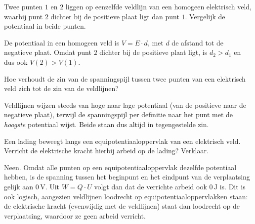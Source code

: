 \documentclass{ximera}
\begin{document}
\begin{question}
    Twee punten $1$ en $2$ liggen op eenzelfde veldlijn van een homogeen elektrisch veld, waarbij punt $2$ dichter bij de positieve plaat ligt dan punt $1$. Vergelijk de potentiaal in beide punten.

    \begin{multipleChoice}
    \end{multipleChoice}

    \begin{solution}\nl
        De potentiaal in een homogeen veld is $V = E \cdot d$, met $d$ de afstand tot de negatieve plaat. Omdat punt $2$ dichter bij de positieve plaat ligt, is $d_2 > d_1$ en dus ook $V(2) > V(1)$.
    \end{solution}
\end{question}

\begin{question}
    Hoe verhoudt de zin van de spanningspijl tussen twee punten van een elektrisch veld zich tot de zin van de veldlijnen?

    \begin{multipleChoice}
    \end{multipleChoice}

    \begin{solution}\nl
        Veldlijnen wijzen steeds van hoge naar lage potentiaal (van de positieve naar de negatieve plaat), terwijl de spanningspijl per definitie naar het punt met de \emph{hoogste} potentiaal wijst. Beide staan dus altijd in tegengestelde zin.
    \end{solution}
\end{question}

\begin{question}
    Een lading beweegt langs een equipotentiaaloppervlak van een elektrisch veld. Verricht de elektrische kracht hierbij arbeid op de lading? Verklaar.

    \begin{solution}\nl
        Neen. Omdat alle punten op een equipotentiaaloppervlak dezelfde potentiaal hebben, is de spanning tussen het beginpunt en het eindpunt van de verplaatsing gelijk aan $0 \, \mathrm{V}$. Uit $W = Q \cdot U$ volgt dan dat de verrichte arbeid ook $0 \, \mathrm{J}$ is. Dit is ook logisch, aangezien veldlijnen loodrecht op equipotentiaaloppervlakken staan: de elektrische kracht (evenwijdig met de veldlijnen) staat dan loodrecht op de verplaatsing, waardoor ze geen arbeid verricht.
    \end{solution}
\end{question}
\end{document}
